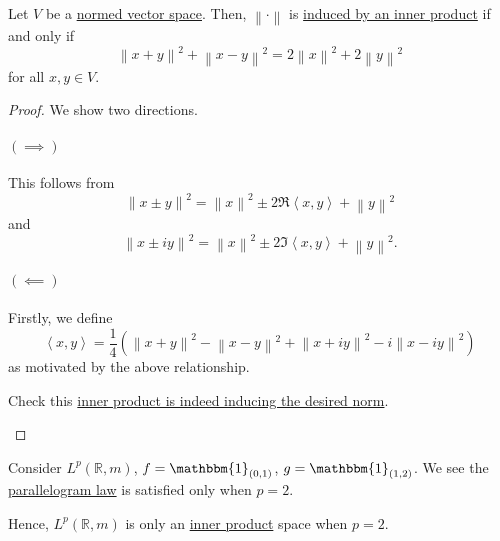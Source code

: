 \begin{theorem}\label{thm:parallelogram-law}
	Let \(V\) be a \hyperref[def:norm]{normed vector space}. Then, \(\left\lVert \cdot\right\rVert\) is
	\hyperref[def:induced-norm-from-inner-product]{induced by an inner product} if and only if
	\[
		\left\lVert x + y\right\rVert^2 + \left\lVert x-y\right\rVert^2 = 2\left\lVert x\right\rVert^2 + 2\left\lVert y\right\rVert^2
	\]
	for all \(x,y \in V\).
\end{theorem}
\begin{proof}
	We show two directions.
	\paragraph{\((\implies )\)}
	This follows from
	\[
		\left\lVert x \pm y\right\rVert^2 = \left\lVert x\right\rVert^2 \pm 2\Re\left< x,y \right> + \left\lVert y\right\rVert^2
	\]
	and
	\[
		\left\lVert x \pm iy\right\rVert ^2 = \left\lVert x\right\rVert^2 \pm 2\Im \left< x,y \right> + \left\lVert y\right\rVert^2.
	\]
	\paragraph{\((\impliedby)\)}
	Firstly, we define
	\[
		\left< x,y \right> = \frac{1}{4}\left(\left\lVert x + y\right\rVert^2 - \left\lVert x - y\right\rVert^2 + \left\lVert x + iy\right\rVert^2 - i\left\lVert x - iy\right\rVert ^2\right)
	\]
	as motivated by the above relationship.
	\begin{exercise}
		Check this \hyperref[def:induced-norm-from-inner-product]{inner product is indeed inducing the desired norm}.
	\end{exercise}
\end{proof}

\begin{eg}
	Consider \(L^p(\mathbb{R},m)\), \(f = \mathbbm{1}_{(0,1)}\), \(g = \mathbbm{1}_{(1,2)}\). We see the \hyperref[thm:parallelogram-law]{parallelogram law}
	is satisfied only when \(p = 2\).

	\begin{remark}
		Hence, \(L^p(\mathbb{R},m)\) is only an \hyperref[def:inner-product]{inner product} space when \(p = 2\).
	\end{remark}
\end{eg}

